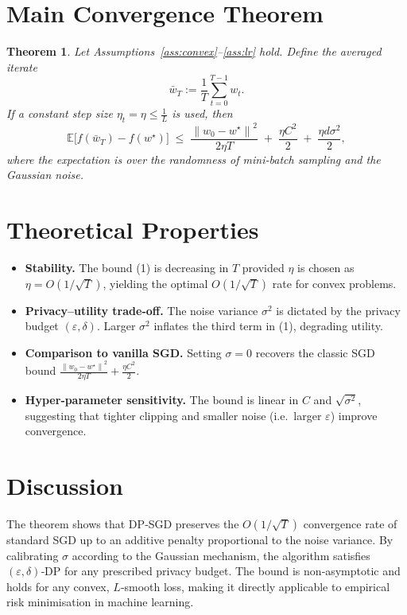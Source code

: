 \documentclass{article}
\newtheorem{theorem}{Theorem}
\newcommand{\E}{\mathbb{E}}
\newcommand{\norm}[1]{\left\|#1\right\|}
\begin{document}
\section*{Main Convergence Theorem}
\begin{theorem}\label{thm:conv}
Let Assumptions~\ref{ass:convex}–\ref{ass:lr} hold. Define the averaged iterate
\[
\bar w_T:=\frac{1}{T}\sum_{t=0}^{T-1}w_t .
\]
If a constant step size $\eta_t=\eta\le\frac{1}{L}$ is used, then
\[
\E\!\bigl[f(\bar w_T)-f(w^{\star})\bigr]
\;\le\;
\frac{\norm{w_0-w^{\star}}^{2}}{2\eta T}
\;+\;
\frac{\eta C^{2}}{2}
\;+\;
\frac{\eta d\sigma^{2}}{2},
\tag{1}
\]
where the expectation is over the randomness of mini‑batch sampling and the Gaussian noise.
\end{theorem}

\section*{Theoretical Properties}
\begin{itemize}[leftmargin=*]
\item \textbf{Stability.} The bound (1) is decreasing in $T$ provided $\eta$ is chosen as $\eta=O(1/\sqrt{T})$, yielding the optimal $O(1/\sqrt{T})$ rate for convex problems.
\item \textbf{Privacy–utility trade‑off.} The noise variance $\sigma^{2}$ is dictated by the privacy budget $(\varepsilon,\delta)$. Larger $\sigma^{2}$ inflates the third term in (1), degrading utility.
\item \textbf{Comparison to vanilla SGD.} Setting $\sigma=0$ recovers the classic SGD bound 
$\frac{\norm{w_0-w^{\star}}^{2}}{2\eta T}+ \frac{\eta C^{2}}{2}$.
\item \textbf{Hyper‑parameter sensitivity.} The bound is linear in $C$ and $\sqrt{\sigma^{2}}$, suggesting that tighter clipping and smaller noise (i.e.\ larger $\varepsilon$) improve convergence.
\end{itemize}

\section*{Discussion}
The theorem shows that DP‑SGD preserves the $O(1/\sqrt{T})$ convergence rate of standard SGD up to an additive penalty proportional to the noise variance. By calibrating $\sigma$ according to the Gaussian mechanism, the algorithm satisfies $(\varepsilon,\delta)$‑DP for any prescribed privacy budget. The bound is non‑asymptotic and holds for any convex, $L$‑smooth loss, making it directly applicable to empirical risk minimisation in machine learning.
\end{document}
